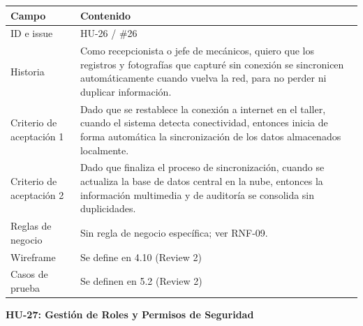 {\def\LTcaptype{none} %
\begin{longtable}[]{@{}
  >{\raggedright\arraybackslash}p{}
  >{\raggedright\arraybackslash}p{}@{}}
\toprule\noalign{}
\begin{minipage}[b]{\linewidth}\raggedright
\textbf{Campo}
\end{minipage} & \begin{minipage}[b]{\linewidth}\raggedright
\textbf{Contenido}
\end{minipage} \\
\midrule\noalign{}
\endhead
\bottomrule\noalign{}
\endlastfoot
ID e issue & HU-26 / \#26 \\
Historia & Como recepcionista o jefe de mecánicos, quiero que los
registros y fotografías que capturé sin conexión se sincronicen
automáticamente cuando vuelva la red, para no perder ni duplicar
información. \\
Criterio de aceptación 1 & Dado que se restablece la conexión a internet
en el taller, cuando el sistema detecta conectividad, entonces inicia de
forma automática la sincronización de los datos almacenados
localmente. \\
Criterio de aceptación 2 & Dado que finaliza el proceso de
sincronización, cuando se actualiza la base de datos central en la nube,
entonces la información multimedia y de auditoría se consolida sin
duplicidades. \\
Reglas de negocio & Sin regla de negocio específica; ver RNF-09. \\
Wireframe & Se define en 4.10 (Review 2) \\
Casos de prueba & Se definen en 5.2 (Review 2) \\
\end{longtable}
}

\textbf{HU-27: Gestión de Roles y Permisos de Seguridad}

